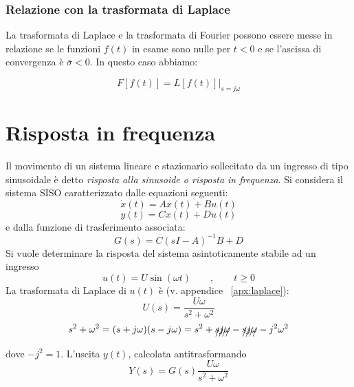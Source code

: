 \documentclass[a4paper]{report}
\begin{document}
\subsubsection{Relazione con la trasformata di Laplace}
La trasformata di Laplace e la trasformata di Fourier possono essere
messe in relazione se le funzioni $f(t)$ in esame sono nulle per $t <
0$ e se l'ascissa di convergenza \`e $\bar{\sigma} < 0$. In questo
caso abbiamo:

\begin{equation}
  F[f(t)] = \left . L[f(t)] \right |_{s = j\omega}
\end{equation}

\section{Risposta in frequenza}
Il movimento di un sistema lineare e stazionario sollecitato da un
ingresso di tipo sinusoidale \`e detto \emph{risposta alla sinusoide o
 risposta in frequenza}. Si considera il
sistema SISO caratterizzato dalle equazioni seguenti:
\begin{equation*}
  \dot{x}(t) = Ax(t) + Bu(t)
\end{equation*}
\begin{equation*}
  y(t) = Cx(t) + Du(t)
\end{equation*}
e dalla funzione di trasferimento associata:
\begin{displaymath}
  G(s) = C(sI-A)^{-1}B + D
\end{displaymath}
Si vuole determinare la risposta del sistema asintoticamente stabile
ad un ingresso  
\begin{equation}\label{eq:sininput}
  u(t) = U \sin (\omega t)\qquad, \qquad t\geq 0
\end{equation}
La trasformata di Laplace di $u(t)$ \`e (v. appendice
~\ref{apx:laplace}): 
\begin{equation}\label{eq:rispsfreq}
  U(s) = \dfrac{U\omega}{s^2 + \omega^2}
\end{equation}
\begin{equation}\label{eq:squadropiuomegaquadro}
  s^2 + \omega^2 = (s + j \omega)(s - j \omega) = s^2 +
  \xout{sj\omega} - \xout{sj\omega} - j^2 \omega^2
\end{equation}
dove $-j^2 = 1$.
L'uscita $y(t)$, calcolata antitrasformando
\begin{displaymath}
  Y(s) = G(s)\dfrac{U\omega}{s^2 + \omega^2}
\end{displaymath}
\end{document}
